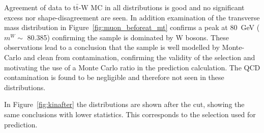 Agreement of data to t$\bar{\textrm{t}}$-W MC in all distributions is good and no significant excess nor shape-disagreement are seen. In addition examination of the transverse mass distribution in Figure~\ref{fig:muon_beforeat_mt} confirms a peak at 80~GeV ($m^{W} \sim$ 80.385) confirming the sample is dominated by W bosons. These observations lead to a conclusion that the sample is well modelled by Monte-Carlo and clean from contamination, confirming the validity of the selection and motivating the use of a Monte Carlo ratio in the prediction calculation. The QCD contamination is found to be negligible and therefore not seen in these distributions.

In Figure~\ref{fig:kinafter} the distributions are shown after the \alt cut, showing the same conclusions with lower statistics. This corresponds to the selection used for prediction.





